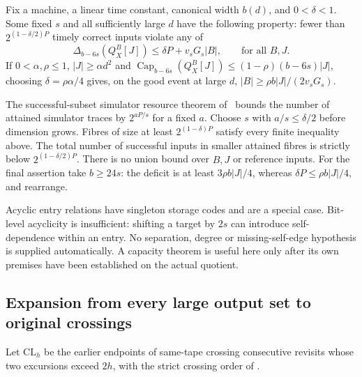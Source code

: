 \begin{corollary}\label{cor:entry-success-tail}
Fix a machine, a linear time constant, canonical width $b(d)$, and
$0<\delta<1$. Some fixed $s$ and all sufficiently large $d$ have the following
property: fewer than $2^{(1-\delta/2)P}$ timely correct inputs violate any of
\[
 \Delta_{b-6s}(Q_X^B[J])\le\delta P+v_sG_s|B|,
 \qquad\text{for all }B,J.
\]
If $0<\alpha,\rho\le1$, $|J|\ge\alpha d^2$ and
$\operatorname{Cap}_{b-6s}(Q_X^B[J])\le(1-\rho)(b-6s)|J|$, choosing
$\delta=\rho\alpha/4$ gives, on the good event at large $d$,
$|B|\ge\rho b|J|/(2v_sG_s)$.
\end{corollary}
\begin{outline}
The successful-subset simulator resource theorem of~\cite{HighRateStorage2026}
bounds the number of attained simulator traces by $2^{aP/s}$ for a fixed
$a$. Choose $s$ with $a/s\le\delta/2$ before dimension grows. Fibres of size
at least $2^{(1-\delta)P}$ satisfy every finite inequality above. The total
number of successful inputs in smaller attained fibres is strictly below
$2^{(1-\delta/2)P}$. There is no union bound over $B,J$ or reference inputs.
For the final assertion take $b\ge24s$: the deficit is at least
$3\rho b|J|/4$, whereas $\delta P\le\rho b|J|/4$, and rearrange.
\end{outline}

Acyclic entry relations have singleton storage codes and are a special case.
Bit-level acyclicity is insufficient: shifting a target by $2s$ can introduce
self-dependence within an entry. No separation, degree or missing-self-edge
hypothesis is supplied automatically. A capacity theorem is useful here only
after its own premises have been established on the actual quotient.

\subsection{Expansion from every large output set to original crossings}

Let $\mathrm{CL}_h$ be the earlier endpoints of same-tape crossing consecutive
revisits whose two excursions exceed $2h$, with the strict crossing order of
\cite{MacroscopicCrossings2026}.

